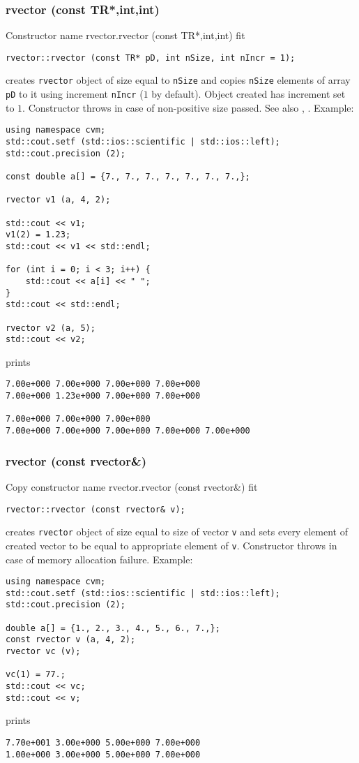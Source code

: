 \subsubsection{rvector (const TR*,int,int)}
Constructor%
\pdfdest name {rvector.rvector (const TR*,int,int)} fit
\begin{verbatim}
rvector::rvector (const TR* pD, int nSize, int nIncr = 1);
\end{verbatim}
creates \verb"rvector" object of size equal to \verb"nSize"
and copies \verb"nSize" elements of
 array \verb"pD" to it using increment \verb"nIncr" ($1$ by default).
Object created has increment set to $1$.
Constructor throws  
in case of non-positive size passed.
See also , .
Example:
\begin{Verbatim}
using namespace cvm;
std::cout.setf (std::ios::scientific | std::ios::left); 
std::cout.precision (2);

const double a[] = {7., 7., 7., 7., 7., 7., 7.,};

rvector v1 (a, 4, 2);

std::cout << v1;
v1(2) = 1.23;
std::cout << v1 << std::endl;

for (int i = 0; i < 3; i++) {
    std::cout << a[i] << " ";
}
std::cout << std::endl;

rvector v2 (a, 5);
std::cout << v2;
\end{Verbatim}
prints
\begin{Verbatim}
7.00e+000 7.00e+000 7.00e+000 7.00e+000
7.00e+000 1.23e+000 7.00e+000 7.00e+000

7.00e+000 7.00e+000 7.00e+000
7.00e+000 7.00e+000 7.00e+000 7.00e+000 7.00e+000
\end{Verbatim}
\newpage




\subsubsection{rvector (const rvector\&)}
Copy constructor%
\pdfdest name {rvector.rvector (const rvector&)} fit
\begin{verbatim}
rvector::rvector (const rvector& v);
\end{verbatim}         
creates \verb"rvector" object of size equal to size of
vector \verb"v" and sets every element of created vector to be equal to
appropriate element of \verb"v".
Constructor throws  
in case of memory allocation failure.
Example:
\begin{Verbatim}
using namespace cvm;
std::cout.setf (std::ios::scientific | std::ios::left); 
std::cout.precision (2);

double a[] = {1., 2., 3., 4., 5., 6., 7.,};
const rvector v (a, 4, 2);
rvector vc (v);

vc(1) = 77.;
std::cout << vc;
std::cout << v;
\end{Verbatim}
prints
\begin{Verbatim}
7.70e+001 3.00e+000 5.00e+000 7.00e+000
1.00e+000 3.00e+000 5.00e+000 7.00e+000
\end{Verbatim}
\newpage




